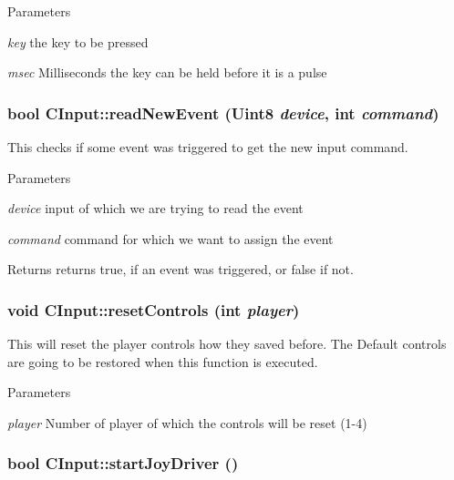 \begin{DoxyParams}{Parameters}
\item[{\em key}]the key to be pressed \item[{\em msec}]Milliseconds the key can be held before it is a pulse \end{DoxyParams}
\hypertarget{class_c_input_a277812473d6522fdb00b7a584440c0a7}{
\subsubsection[{readNewEvent}]{\setlength{\rightskip}{0pt plus 5cm}bool CInput::readNewEvent (Uint8 {\em device}, \/  int {\em command})}}
\label{class_c_input_a277812473d6522fdb00b7a584440c0a7}


This checks if some event was triggered to get the new input command. 


\begin{DoxyParams}{Parameters}
\item[{\em device}]input of which we are trying to read the event \item[{\em command}]command for which we want to assign the event \end{DoxyParams}
\begin{DoxyReturn}{Returns}
returns true, if an event was triggered, or false if not. 
\end{DoxyReturn}
\hypertarget{class_c_input_a459565c75153405d01e521da2084cd74}{
\subsubsection[{resetControls}]{\setlength{\rightskip}{0pt plus 5cm}void CInput::resetControls (int {\em player})}}
\label{class_c_input_a459565c75153405d01e521da2084cd74}


This will reset the player controls how they saved before. The Default controls are going to be restored when this function is executed. 


\begin{DoxyParams}{Parameters}
\item[{\em player}]Number of player of which the controls will be reset (1-\/4) \end{DoxyParams}
\hypertarget{class_c_input_a5f76503ef7e49c5d6d1ab4eb2a2480e9}{
\subsubsection[{startJoyDriver}]{\setlength{\rightskip}{0pt plus 5cm}bool CInput::startJoyDriver ()}}
\label{class_c_input_a5f76503ef7e49c5d6d1ab4eb2a2480e9}



